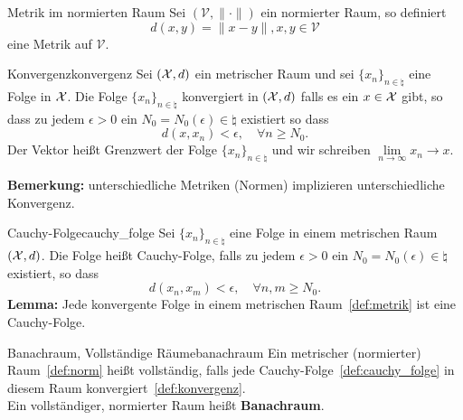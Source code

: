 \begin{recipe}{Metrik im normierten Raum}
  Sei $(\mathcal{V}, \|\cdot\|)$ ein normierter Raum, so definiert
  \begin{equation*}
    d(x,y) = \| x - y \|, x, y \in \mathcal{V}
  \end{equation*}
  eine Metrik auf $\mathcal{V}$.
\end{recipe}

\begin{boringDef}{Konvergenz}{konvergenz}
  Sei $(\mathcal{X}, d)$  ein metrischer Raum und sei $\{x_{n}\}_{n\in\natural}$ eine Folge in $\mathcal{X}$.
  Die Folge $\{x_{n}\}_{n\in\natural}$ konvergiert in $(\mathcal{X}, d)$ falls es ein $x \in \mathcal{X}$ gibt, so dass zu jedem $\epsilon > 0$ ein $N_{0} = N_{0}(\epsilon) \in \natural$ existiert so dass
  \begin{equation*}
    d(x, x_{n}) < \epsilon, \quad \forall n \geq N_{0}.
  \end{equation*}
  Der Vektor heißt Grenzwert der Folge $\{x_{n}\}_{n\in\natural}$ und wir schreiben $\lim\limits_{n\to\infty} x_{n} \to x$.

  \textbf{Bemerkung:} unterschiedliche Metriken (Normen) implizieren unterschiedliche Konvergenz.
\end{boringDef}

\begin{boringDef}{Cauchy-Folge}{cauchy_folge}
  Sei $\{x_{n}\}_{n\in\natural}$ eine Folge in einem metrischen Raum $(\mathcal{X}, d)$.
  Die Folge heißt Cauchy-Folge, falls zu jedem $\epsilon > 0$ ein $N_{0} = N_{0}(\epsilon) \in \natural$ existiert, so dass
  \begin{equation*}
    d(x_{n}, x_{m}) < \epsilon, \quad \forall n,m \geq N_{0}.
  \end{equation*}
  \textbf{Lemma:} Jede konvergente Folge in einem metrischen Raum~\ref{def:metrik} ist eine Cauchy-Folge.
\end{boringDef}


\begin{boringDef}{Banachraum, Vollständige Räume}{banachraum}
  Ein metrischer (normierter) Raum~\ref{def:norm} heißt vollständig, falls jede Cauchy-Folge~\ref{def:cauchy_folge} in diesem Raum konvergiert~\ref{def:konvergenz}.\\
  Ein vollständiger, normierter Raum heißt \textbf{Banachraum}.
\end{boringDef}


